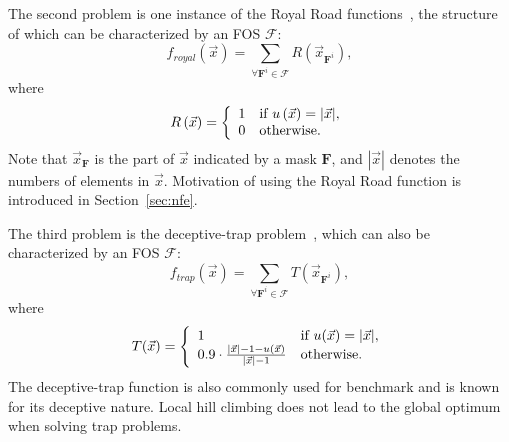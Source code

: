 \documentclass{sig-alternate}
\begin{document}
The second problem is one instance of the Royal Road functions~\cite{1992_RR},
the structure of which can be characterized by an FOS $\mathcal F$:
\begin{equation}
\label{eq:RR}
f_{royal}\left(\vec{x}\right) = \sum_{\forall {\mathbf F}^i \in {\mathcal F}} R\left(\vec{x}_{{\mathbf F}^i}\right),
\end{equation}
where
\begin{equation*}
R\left(\vec{x}\right) = 
\left\{
\begin{array}{l l}
1 & \text{if }u\left({\vec x}\right)=|{\vec x}|, \\ %
0 & \text{otherwise}.
\end{array}
\right.
\end{equation*}
Note that $\vec{x}_{\mathbf F}$ is the part of $\vec x$ indicated by a mask $\mathbf F$,
and $|\vec x|$ denotes the numbers of elements in $\vec x$.
Motivation of using the Royal Road function is introduced in Section~\ref{sec:nfe}.

The third problem is the deceptive-trap problem~\cite{1992_trap}, which can also be characterized by an FOS $\mathcal F$:
\begin{equation*}
f_{trap}\left(\vec{x}\right) = \sum_{\forall {\mathbf F}^i \in {\mathcal F}} T\left(\vec{x}_{{\mathbf F}^i}\right),
\end{equation*}
where
\begin{equation*}
T(\vec{x}) = 
\left\{
\begin{array}{l l}
1 & \text{if $u(\vec{x}) = |\vec{x}|$}, \\
0.9 \cdot \frac{|\vec{x}|-1-u(\vec{x})}{|\vec{x}|-1} & \text{otherwise}.
\end{array}
\right.
\end{equation*}
The deceptive-trap function is also commonly used for benchmark and is known for its deceptive nature.
Local hill climbing does not lead to the global optimum when solving trap problems.
\end{document}
